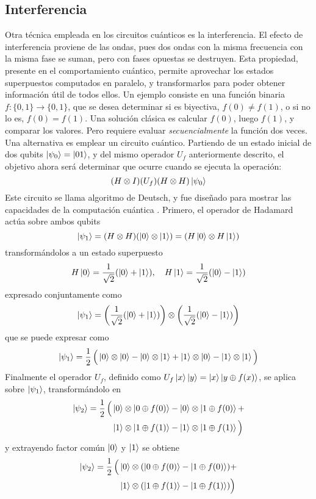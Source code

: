 \subsection{Interferencia}
Otra técnica empleada en los circuitos cuánticos es la interferencia. El efecto 
de interferencia proviene de las ondas, pues dos ondas con la misma frecuencia 
con la misma fase se suman, pero con fases opuestas se destruyen.  Esta 
propiedad, presente en el comportamiento cuántico, permite aprovechar los 
estados superpuestos computados en paralelo, y transformarlos para poder obtener 
información útil de todos ellos.
Un ejemplo consiste en una función binaria $f:\{0,1\} \rightarrow \{0,1\}$, que 
se desea determinar si es biyectiva, $f(0) \neq f(1)$, o si no lo es, $f(0) = 
f(1)$. Una solución clásica es calcular $f(0)$, luego $f(1)$, y comparar los 
valores. Pero requiere evaluar \textit{secuencialmente} la función dos veces.  
Una alternativa es emplear un circuito cuántico.
Partiendo de un estado inicial de dos qubits $\ket{\psi_{0}} = \ket{01}$, y del mismo 
operador $U_f$ anteriormente descrito, el objetivo ahora será determinar que 
ocurre cuando se ejecuta la operación:
$$ (H \otimes I)(U_f)(H \otimes H)\ket{\psi_{0}} $$
Este circuito se llama algoritmo de Deutsch, y fue diseñado para mostrar las 
capacidades de la computación cuántica \cite{deutsch85}.
Primero, el operador de Hadamard actúa sobre ambos qubits
$$ \ket{\psi_{1}} = (H \otimes H)(\ket{0} \otimes \ket{1}) =
(H \ket{0} \otimes H \ket{1})$$
transformándolos a un estado superpuesto
$$H \ket 0 = \frac{1}{\sqrt 2}(\ket 0 + \ket 1), \quad
H \ket 1 = \frac{1}{\sqrt 2}(\ket 0 - \ket 1)$$
expresado conjuntamente como
$$ \ket{\psi_{1}} = \left( \frac{1}{\sqrt 2}(\ket 0 + \ket 1) \right)
\otimes \left( \frac{1}{\sqrt 2}(\ket 0 - \ket 1) \right) $$
que se puede expresar como
$$ \ket{\psi_{1}} = \frac{1}{2} \, \Big( \ket{0} \otimes \ket{0} - \ket{0} \otimes \ket{1} + \ket{1} \otimes \ket{0} - \ket{1} \otimes \ket{1} \Big) $$
Finalmente el operador $U_f$, definido como $ U_f \ket{x}\ket{y} = \ket{x}\ket{y 
\oplus f(x)}$, se aplica sobre $\ket{\psi_{1}}$, transformándolo en
\begin{equation*}
\begin{split}
\ket{\psi_{2}} = \frac{1}{2} \, \Big(
&\ket{0} \otimes \ket{0 \oplus f(0)} - \ket{0} \otimes \ket{1 \oplus f(0)} + \\
&\ket{1} \otimes \ket{1 \oplus f(1)} - \ket{1} \otimes \ket{1 \oplus f(1)} \Big)
\end{split}
\end{equation*}
y extrayendo factor común $\ket{0}$ y $\ket{1}$ se obtiene
\begin{equation*}
\begin{split}
\ket{\psi_{2}} = \frac{1}{2} \, \Big(
& \ket{0} \otimes ( \ket{0 \oplus f(0)} - \ket{1 \oplus f(0)} ) + \\
& \ket{1} \otimes ( \ket{1 \oplus f(1)} - \ket{1 \oplus f(1)} ) \Big)
\end{split}
\end{equation*}
